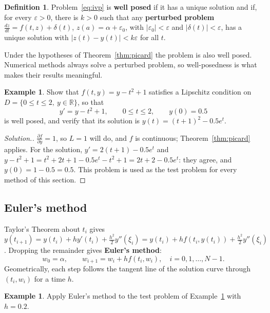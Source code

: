 \documentclass[11pt,a4paper]{article}
\numberwithin{equation}{section}
\theoremstyle{definition}
\newtheorem{defn}[thm]{Definition}
\newtheorem{exa}[thm]{Example}
\newenvironment{solution}
  {\renewcommand{\qedsymbol}{}\begin{proof}[\textit{Solution}.]}
  {\end{proof}}
\begin{document}
\begin{defn}
Problem~\eqref{eq:ivp} is \textbf{well posed} if it has a unique solution and if, for every $\varepsilon>0$, there is $k>0$ such that any
\textbf{perturbed problem} $\frac{dz}{dt} = f(t,z)+\delta(t)$, $z(a) = \alpha+\varepsilon_0$, with $|\varepsilon_0|<\varepsilon$ and $|\delta(t)|<\varepsilon$, has a unique
solution with $|z(t)-y(t)|<k\varepsilon$ for all $t$.
\end{defn}

Under the hypotheses of Theorem~\ref{thm:picard} the problem is also well posed. Numerical methods always solve a perturbed problem, so
well-posedness is what makes their results meaningful.

\begin{exa}
\label{exa:lipschitz}
Show that $f(t,y) = y-t^2+1$ satisfies a Lipschitz condition on $D = \{0\leq t\leq2,\ y\in\mathbb R\}$, so that
$$y' = y-t^2+1,\qquad 0\leq t\leq2,\qquad y(0) = 0.5$$
is well posed, and verify that its solution is $y(t) = (t+1)^2-0.5e^t$.
\end{exa}

\begin{solution}
$\frac{\partial f}{\partial y} = 1$, so $L = 1$ will do, and $f$ is continuous; Theorem~\ref{thm:picard} applies. For the solution,
$y' = 2(t+1)-0.5e^t$ and $y-t^2+1 = t^2+2t+1-0.5e^t-t^2+1 = 2t+2-0.5e^t$: they agree, and $y(0) = 1-0.5 = 0.5$. This problem is used as the test
problem for every method of this section.
\end{solution}


\subsection{Euler's method}
\label{sec:euler}

Taylor's Theorem about $t_i$ gives $y(t_{i+1}) = y(t_i)+hy'(t_i)+\frac{h^2}2y''(\xi_i) = y(t_i)+hf(t_i,y(t_i))+\frac{h^2}{2}y''(\xi_i)$. Dropping the
remainder gives \textbf{Euler's method}:
\begin{equation}\label{eq:euler}
w_0 = \alpha,\qquad w_{i+1} = w_i+hf(t_i,w_i),\quad i = 0,1,\dots,N-1 .
\end{equation}
Geometrically, each step follows the tangent line of the solution curve through $(t_i,w_i)$ for a time $h$.

\begin{exa}
\label{exa:euler}
Apply Euler's method to the test problem of Example~\ref{exa:lipschitz} with $h = 0.2$.
\end{exa}
\end{document}
